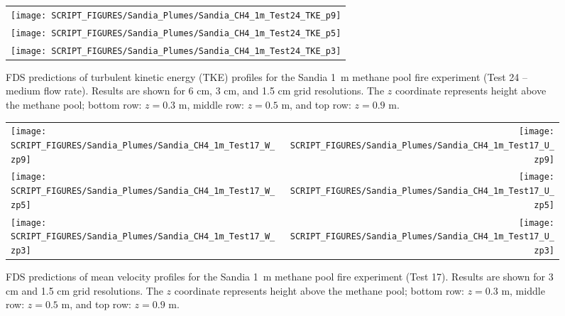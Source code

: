 \begin{figure}[p]
\begin{center}
\begin{tabular}{c}
\texttt{[image: SCRIPT\_FIGURES/Sandia\_Plumes/Sandia\_CH4\_1m\_Test24\_TKE\_p9]} \\
\texttt{[image: SCRIPT\_FIGURES/Sandia\_Plumes/Sandia\_CH4\_1m\_Test24\_TKE\_p5]} \\
\texttt{[image: SCRIPT\_FIGURES/Sandia\_Plumes/Sandia\_CH4\_1m\_Test24\_TKE\_p3]}
\end{tabular}
\caption[Sandia 1~m methane pool fire (Test 24) turbulent kinetic energy]
{FDS predictions of turbulent kinetic energy (TKE) profiles for the Sandia 1~m methane pool fire experiment (Test 24 -- medium flow rate). Results are shown for 6 cm, 3 cm, and 1.5 cm grid resolutions. The $z$ coordinate represents height above the methane pool; bottom row: $z=0.3$ m, middle row: $z=0.5$ m, and top row: $z=0.9$ m.}
\label{Sandia_CH4_1m_Test24_tke}
\end{center}
\end{figure}

\begin{figure}[p]
\begin{tabular*}{\textwidth}{l@{\extracolsep{\fill}}r}
\texttt{[image: SCRIPT\_FIGURES/Sandia\_Plumes/Sandia\_CH4\_1m\_Test17\_W\_zp9]} &
\texttt{[image: SCRIPT\_FIGURES/Sandia\_Plumes/Sandia\_CH4\_1m\_Test17\_U\_zp9]} \\
\texttt{[image: SCRIPT\_FIGURES/Sandia\_Plumes/Sandia\_CH4\_1m\_Test17\_W\_zp5]} &
\texttt{[image: SCRIPT\_FIGURES/Sandia\_Plumes/Sandia\_CH4\_1m\_Test17\_U\_zp5]} \\
\texttt{[image: SCRIPT\_FIGURES/Sandia\_Plumes/Sandia\_CH4\_1m\_Test17\_W\_zp3]} &
\texttt{[image: SCRIPT\_FIGURES/Sandia\_Plumes/Sandia\_CH4\_1m\_Test17\_U\_zp3]}
\end{tabular*}
\caption[Sandia 1~m methane pool fire (Test 17) mean velocity profiles]
{FDS predictions of mean velocity profiles for the Sandia 1~m methane pool fire experiment (Test 17). Results are shown for 3 cm and 1.5 cm grid resolutions. The $z$ coordinate represents height above the methane pool; bottom row: $z=0.3$ m, middle row: $z=0.5$ m, and top row: $z=0.9$ m.}
\label{Sandia_CH4_1m_Test17_velocity}
\end{figure}

